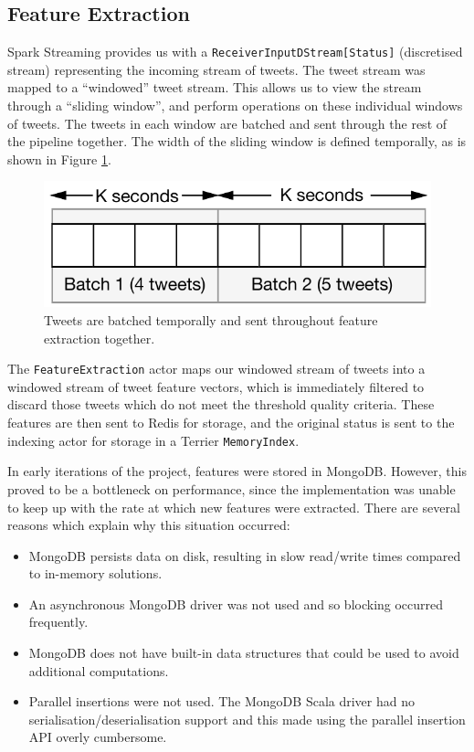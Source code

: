 \documentclass{l4proj}
\newcommand{\code}[1]{\texttt{#1}}
\begin{document}
    \subsection{Feature Extraction}
        
        Spark Streaming provides us with a \code{ReceiverInputDStream[Status]} (discretised stream) representing the incoming stream of tweets. The tweet stream was mapped to a ``windowed'' tweet stream. This allows us to view the stream through a ``sliding window'', and perform operations on these individual windows of tweets. The tweets in each window are batched and sent through the rest of the pipeline together. The width of the sliding window is defined temporally, as is shown in Figure \ref{slidingwindow}.
        
\begin{figure}
\centering
\includegraphics[scale=0.8]{slidingwindow.pdf}
\caption{Tweets are batched temporally and sent throughout feature extraction together.}
\label{slidingwindow}
\end{figure}

        The \code{FeatureExtraction} actor maps our windowed stream of tweets into a windowed stream of tweet feature vectors, which is immediately filtered to discard those tweets which do not meet the threshold quality criteria. These features are then sent to Redis for storage, and the original status is sent to the indexing actor for storage in a Terrier \code{MemoryIndex}.
        
        In early iterations of the project, features were stored in MongoDB. However, this proved to be a bottleneck on performance, since the implementation was unable to keep up with the rate at which new features were extracted. There are several reasons which explain why this situation occurred:
        
        \begin{itemize}
        \item MongoDB persists data on disk, resulting in slow read/write times compared to in-memory solutions.
        \item An asynchronous MongoDB driver was not used and so blocking occurred frequently.
        \item MongoDB does not have built-in data structures that could be used to avoid additional computations.
        \item Parallel insertions were not used. The MongoDB Scala driver had no serialisation/deserialisation support and this made using the parallel insertion API overly cumbersome.
        \end{itemize}
        
\end{document}
